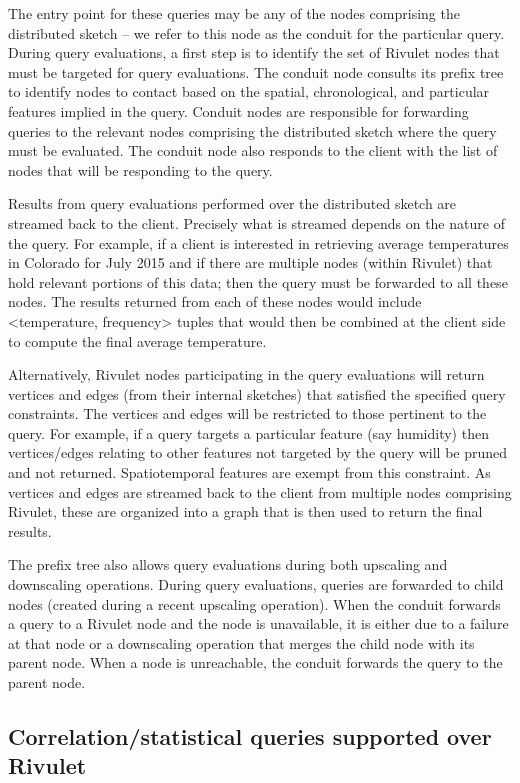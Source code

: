 The entry point for these queries may be any of the nodes comprising the distributed sketch – we refer to this node as the conduit for the particular query.  During query evaluations, a first step is to identify the set of Rivulet nodes that must be targeted for query evaluations. The conduit node consults its prefix tree to identify nodes to contact based on the spatial, chronological, and particular features implied in the query. Conduit nodes are responsible for forwarding queries to the relevant nodes comprising the distributed sketch where the query must be evaluated.  The conduit node also responds to the client with the list of nodes that will be responding to the query. 

Results from query evaluations performed over the distributed sketch are streamed back to the client.  Precisely what is streamed depends on the nature of the query.  For example, if a client is interested in retrieving average temperatures in Colorado for July 2015 and if there are multiple nodes (within Rivulet) that hold relevant portions of this data; then the query must be forwarded to all these nodes. The results returned from each of these nodes would include <temperature, frequency> tuples that would then be combined at the client side to compute the final average temperature.

Alternatively, Rivulet nodes participating in the query evaluations will return vertices and edges (from their internal sketches) that satisfied the specified query constraints. The vertices and edges will be restricted to those pertinent to the query. For example, if a query targets a particular feature (say humidity) then vertices/edges relating to other features not targeted by the query will be pruned and not returned.  Spatiotemporal features are exempt from this constraint. As vertices and edges are streamed back to the client from multiple nodes comprising Rivulet, these are organized into a graph that is then used to return the final results. 

The prefix tree also allows query evaluations during both upscaling and downscaling operations. During query evaluations, queries are forwarded to child nodes (created during a recent upscaling operation). When the conduit forwards a query to a Rivulet node and the node is unavailable, it is either due to a failure at that node or a downscaling operation that merges the child node with its parent node. When a node is unreachable, the conduit forwards the query to the parent node. 


\subsection{Correlation/statistical queries supported over Rivulet}

